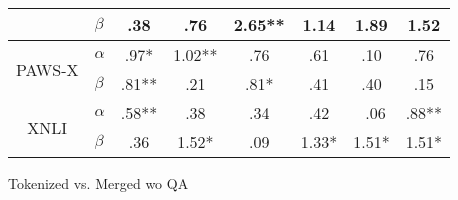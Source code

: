 {{\begin{tabular}{llcc|cc|cc}
    \multicolumn{1}{c}{}                         & $\beta$   & \multicolumn{1}{c|}{\cellcolor{purple} .38}     & \multicolumn{1}{c|}{\cellcolor{purple} .76}    & \multicolumn{1}{c|}{\cellcolor{yellow} 2.65**}    & \multicolumn{1}{c|}{\cellcolor{yellow} 1.14}   & \multicolumn{1}{c|}{\cellcolor{yellow} 1.89}  & \multicolumn{1}{c}{\cellcolor{purple} 1.52}     \\ \hline
    \multicolumn{1}{c}{\multirow{2}{*}{PAWS-X}}  & $\alpha$  & \multicolumn{1}{c|}{\cellcolor{yellow} .97*}    & \multicolumn{1}{c|}{\cellcolor{purple} 1.02**} & \multicolumn{1}{c|}{\cellcolor{yellow} .76}       & \multicolumn{1}{c|}{\cellcolor{purple} .61}    & \multicolumn{1}{c|}{\cellcolor{purple} .10}   & \multicolumn{1}{c}{\cellcolor{purple} .76}      \\
    \multicolumn{1}{c}{}                         & $\beta$   & \multicolumn{1}{c|}{\cellcolor{yellow} .81**}   & \multicolumn{1}{c|}{\cellcolor{yellow} .21}    & \multicolumn{1}{c|}{\cellcolor{yellow} .81*}      & \multicolumn{1}{c|}{\cellcolor{yellow} .41}    & \multicolumn{1}{c|}{\cellcolor{purple} .40}   & \multicolumn{1}{c}{\cellcolor{purple} .15}      \\ \cline{3-8}
    \multicolumn{1}{c}{\multirow{2}{*}{XNLI}}    & $\alpha$  & \multicolumn{1}{c|}{\cellcolor{yellow} .58**}   & \multicolumn{1}{c|}{\cellcolor{yellow} .38}    & \multicolumn{1}{c|}{\cellcolor{yellow} .34}       & \multicolumn{1}{c|}{\cellcolor{yellow} .42}    & \multicolumn{1}{c|}{\cellcolor{yellow} .06}   & \multicolumn{1}{c}{\cellcolor{yellow} .88**}    \\
    \multicolumn{1}{c}{}                         & $\beta$   & \multicolumn{1}{c|}{\cellcolor{yellow} .36}     & \multicolumn{1}{c|}{\cellcolor{purple} 1.52*}  & \multicolumn{1}{c|}{\cellcolor{yellow} .09}       & \multicolumn{1}{c|}{\cellcolor{yellow} 1.33*}  & \multicolumn{1}{c|}{\cellcolor{yellow} 1.51*} & \multicolumn{1}{c}{\cellcolor{purple} 1.51*}    \\
    \end{tabular}
  }
}{Tokenized vs. Merged wo QA}

